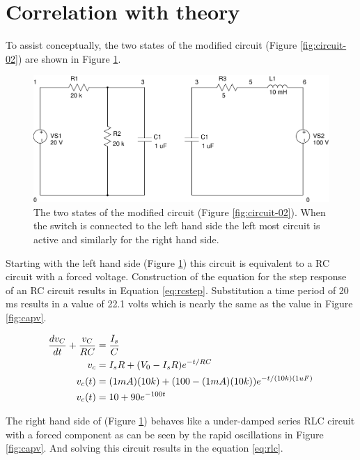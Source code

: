 \documentclass{article}
\begin{document}
\clearpage


\section{Correlation with theory}

To assist conceptually, the two states of the modified circuit
(Figure \ref{fig:circuit-02}) are shown in Figure \ref{fig:circuit-03}.

\begin{figure}
\center
\includegraphics[scale=0.5]{spice/circuit-03}
\caption{The two states of the modified circuit (Figure \ref{fig:circuit-02}).
When the switch is connected to the left hand side the left most circuit
is active and similarly for the right hand side.
}
\label{fig:circuit-03}
\end{figure}

Starting with the left hand side (Figure \ref{fig:circuit-03}) this
circuit is equivalent to a RC circuit with a forced voltage.
Construction of the equation for the step response of an RC circuit
results in Equation \ref{eq:rcstep}.
Substitution a time period of 20 ms results in a value of 22.1 volts
which is nearly the same as the value in Figure \ref{fig:capv}.

\begin{align}
	\frac{dv_C}{dt} + \frac{v_C}{R C} &= \frac{I_s}{C} \notag \\
	v_c &= I_s R + (V_0 - I_s R) e^{-t / RC} \notag \\
	v_c(t) &= (1 mA) (10k) + (100 - (1 mA) (10k)) e^{-t / (10k) (1 uF)} \notag \\
	v_c(t) &= 10 + 90 e^{-100 t} \label{eq:rcstep}
\end{align}


The right hand side of (Figure \ref{fig:circuit-03}) behaves like a
under-damped series RLC circuit with a forced component as can be seen by the rapid
oscillations in Figure \ref{fig:capv}.
And solving this circuit results in the equation \ref{eq:rlc}.
\end{document}
